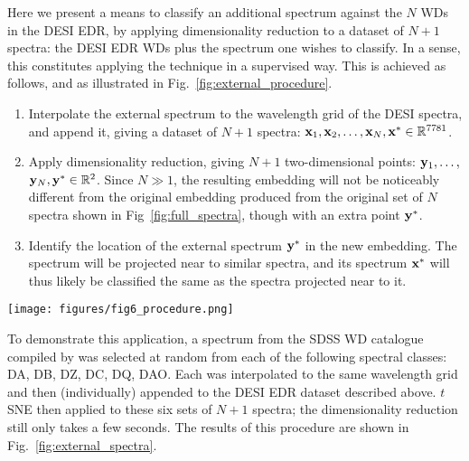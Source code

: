 \documentclass[fleqn,usenatbib]{mnras}
\def\xb{\vb{x}}
\def\yb{\vb{y}}
\begin{document}
Here we present a means to classify an additional spectrum against the $N$ WDs in the DESI EDR, by applying dimensionality reduction to a dataset of $N+1$ spectra: the DESI EDR WDs plus the spectrum one wishes to classify.
In a sense, this constitutes applying the technique in a supervised way.
This is achieved as follows, and as illustrated in Fig.~\ref{fig:external_procedure}.
\begin{enumerate}
\item
Interpolate the external spectrum to the wavelength grid of the DESI spectra, and append it, giving a dataset of $N+1$ spectra: $\xb_1, \xb_2, \dots, \xb_N, \xb^* \in \mathbb{R}^{7781}$.
\item
Apply dimensionality reduction, giving $N+1$ two-dimensional points: $\yb_1, \dots,$ $\yb_N, \yb^* \in \mathbb{R}^2$.
Since $N\gg1$, the resulting embedding will not be noticeably different from the original embedding produced from the original set of $N$ spectra shown in Fig~\ref{fig:full_spectra}, though with an extra point $\yb^*$.
\item
Identify the location of the external spectrum $\yb^*$ in the new embedding.
The spectrum will be projected near to similar spectra, and its spectrum $\xb^*$ will thus likely be classified the same as the spectra projected near to it.
\end{enumerate}

\begin{figure*}
\texttt{[image: figures/fig6\_procedure.png]}
\caption{
    Procedure for classifying external WD spectra against DESI EDR (see text).
    One would estimate the classification of this spectrum (black) as a DA.
}
\label{fig:external_procedure}
\end{figure*}

To demonstrate this application, a spectrum from the SDSS WD catalogue compiled by \citet{gentilefusillo19} was selected at random from each of the following spectral classes: DA, DB, DZ, DC, DQ, DAO.
Each was interpolated to the same wavelength grid and then (individually) appended to the DESI EDR dataset described above.
$t$SNE then applied to these six sets of $N+1$ spectra; the dimensionality reduction still only takes a few seconds.
The results of this procedure are shown in Fig.~\ref{fig:external_spectra}.
\end{document}
